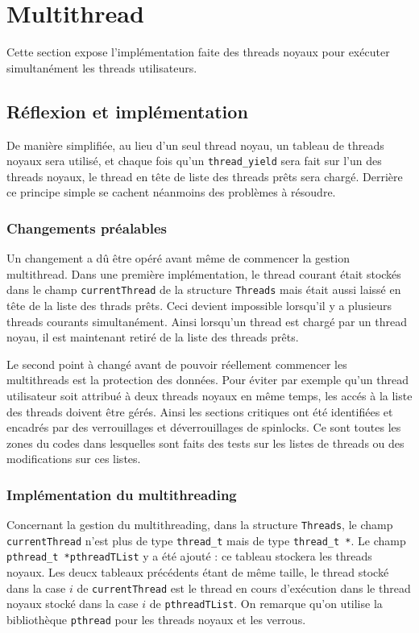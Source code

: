 \documentclass[a4paper,11pt]{article}
\begin{document}
\section{Multithread}

Cette section expose l'implémentation faite des threads noyaux pour exécuter simultanément les threads utilisateurs.

\subsection{Réflexion et implémentation}

De manière simplifiée, au lieu d'un seul thread noyau, un tableau de threads noyaux sera utilisé, et chaque fois qu'un \texttt{thread\_yield} sera fait sur l'un des threads noyaux, le thread en tête de liste des threads prêts sera chargé. Derrière ce principe simple se cachent néanmoins des problèmes à résoudre.

\subsubsection*{Changements préalables}

Un changement a dû être opéré avant même de commencer la gestion multithread. Dans une première implémentation, le thread courant était stockés dans le champ \texttt{currentThread} de la structure \texttt{Threads} mais était aussi laissé en tête de la liste des thrads prêts. Ceci devient impossible lorsqu'il y a plusieurs threads courants simultanément. Ainsi lorsqu'un thread est chargé par un thread noyau, il est maintenant retiré de la liste des threads prêts.

Le second point à changé avant de pouvoir réellement commencer les multithreads est la protection des données. Pour éviter par exemple qu'un thread utilisateur soit attribué à deux threads noyaux en même temps, les accés à la liste des threads doivent être gérés. Ainsi les sections critiques ont été identifiées et encadrés par des verrouillages et déverrouillages de spinlocks. Ce sont toutes les zones du codes dans lesquelles sont faits des tests sur les listes de threads ou des modifications sur ces listes.

\subsubsection*{Implémentation du multithreading}

Concernant la gestion du multithreading, dans la structure \texttt{Threads}, le champ \texttt{currentThread} n'est plus de type \texttt{thread\_t} mais de type \texttt{thread\_t *}. Le champ \texttt{pthread\_t *pthreadTList} y a été ajouté : ce tableau stockera les threads noyaux. Les deucx tableaux précédents étant de même taille, le thread stocké dans la case $i$ de \texttt{currentThread} est le thread en cours d'exécution dans le thread noyaux stocké dans la case $i$ de \texttt{pthreadTList}. On remarque qu'on utilise la bibliothèque \texttt{pthread} pour les threads noyaux et les verrous.\\
\end{document}
